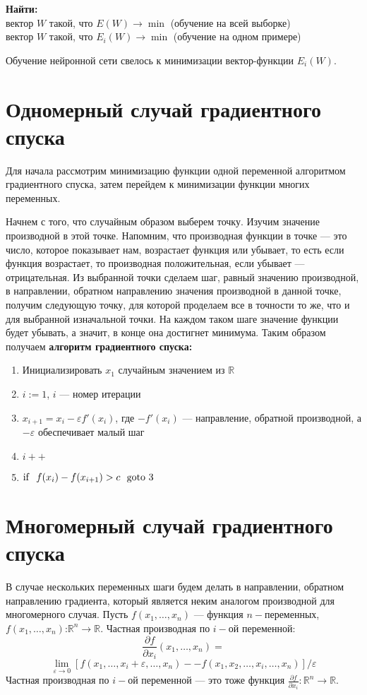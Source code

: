 \documentclass[14pt]{extreport}
\begin{document}
        {\bf
            Найти:
        } \\
           вектор $W$ такой, что $E(W) \rightarrow \min$ (обучение на всей выборке)\\
           вектор $W$ такой, что $E_i(W) \rightarrow \min$ (обучение на одном примере)

        \medskip
        Обучение нейронной сети свелось к минимизации вектор-функции $E_i(W)$.
    \section{Одномерный случай градиентного спуска}
        Для начала рассмотрим минимизацию функции одной переменной алгоритмом градиентного спуска, затем перейдем к минимизации функции многих переменных.

        Начнем с того, что случайным образом выберем точку. Изучим значение производной в этой точке. Напомним, что производная функции в точке --- это число, которое показывает нам, возрастает функция или убывает, то есть если функция возрастает, то производная положительная, если убывает --- отрицательная.
        Из выбранной точки сделаем шаг, равный значению производной, в направлении, обратном направлению значения производной в данной точке, получим следующую точку, для которой проделаем все в точности то же, что и для выбранной изначальной точки. На каждом таком шаге значение функции будет убывать, а значит, в конце она достигнет минимума. Таким образом получаем \textbf{алгоритм градиентного спуска:}
        \begin{enumerate}
         \item Инициализировать $x_1$ случайным значением из $\mathbb{R}$
         \item $i:=1$, $i$ --- номер итерации
         \item $x_{i+1}=x_i-\varepsilon f'(x_i)$, где $-f'(x_i)$ --- направление, обратной производной, а $-\varepsilon$ обеспечивает малый шаг
         \item $i++$
         \item ${\rm if}\ \ f(x_{i})-f(x_{i+1}) >c\ \ {\rm goto}\ 3$
        \end{enumerate}

    \section{Многомерный случай градиентного спуска}
        В случае нескольких переменных шаги будем делать в направлении, обратном направлению градиента, который является неким аналогом производной для многомерного случая.
        Пусть $f(x_1, \ldots, x_n)$ --- функция $n-$переменных, $f(x_1, \ldots, x_n)$:$\mathbb{R}^n\rightarrow \mathbb{R}$.
        Частная производная по $i-$ой переменной: $$\frac{\partial f}{\partial x_i}(x_1, \ldots, x_n) = $$
        $$\lim_{\varepsilon \to  0}[f(x_1, \ldots, x_i + \varepsilon, \ldots, x_n) -- f(x_1, x_2, \ldots, x_i, \ldots, x_n)]/ \varepsilon$$
        Частная производная по $i-$ой переменной --- это тоже функция $\frac{\partial f}{\partial x_i}: \mathbb{R}^n\rightarrow \mathbb{R}$.
\end{document}
